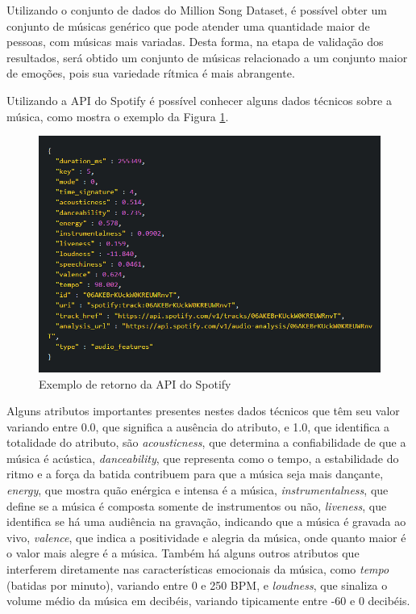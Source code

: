 \documentclass[
	12pt,				%
	openright,			%
	oneside,
	a4paper,			%
	english,			%
	french,				%
	spanish,			%
	brazil				%
	]{abntex2}
\begin{document}
    Utilizando o conjunto de dados do Million Song Dataset, é possível obter um conjunto de músicas genérico que pode atender uma quantidade maior de pessoas, com músicas mais variadas. Desta forma, na etapa de validação dos resultados, será obtido um conjunto de músicas relacionado a um conjunto maior de emoções, pois sua variedade rítmica é mais abrangente.
    
    Utilizando a API do Spotify é possível conhecer alguns dados técnicos sobre a música, como mostra o exemplo da Figura \ref{fig_spotify_api}. 
    
    \begin{figure}[H]
        \caption{\label{fig_spotify_api}Exemplo de retorno da API do Spotify}
        \includegraphics[width=\textwidth]{SpotifyAPI.PNG}
    \end{figure}
    
    Alguns atributos importantes presentes nestes dados técnicos que têm seu valor variando entre 0.0, que significa a ausência do atributo, e 1.0, que identifica a totalidade do atributo, são \textit{acousticness}, que determina a confiabilidade de que a música é acústica, \textit{danceability}, que representa como o tempo, a estabilidade do ritmo e a força da batida contribuem para que a música seja mais dançante, \textit{energy}, que mostra quão enérgica e intensa é a música, \textit{instrumentalness}, que define se a música é composta somente de instrumentos ou não, \textit{liveness}, que identifica se há uma audiência na gravação, indicando que a música é gravada ao vivo, \textit{valence}, que indica a positividade e alegria da música, onde quanto maior é o valor mais alegre é a música. Também há alguns outros atributos que interferem diretamente nas características emocionais da música, como \textit{tempo} (batidas por minuto), variando entre 0 e 250 BPM, e \textit{loudness}, que sinaliza o volume médio da música em decibéis, variando tipicamente entre -60 e 0 decibéis.
    
\end{document}
